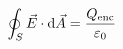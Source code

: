 \documentclass[preview]{standalone}
\begin{document}
\begin{align*}
\special{dvisvgm:raw <g id='unique000'>}\oint_S \vec{E} \cdot \mathrm{d}\vec{A} = \frac{Q_{\text{enc}}}{\varepsilon_0}\special{dvisvgm:raw </g>}
\end{align*}
\end{document}
